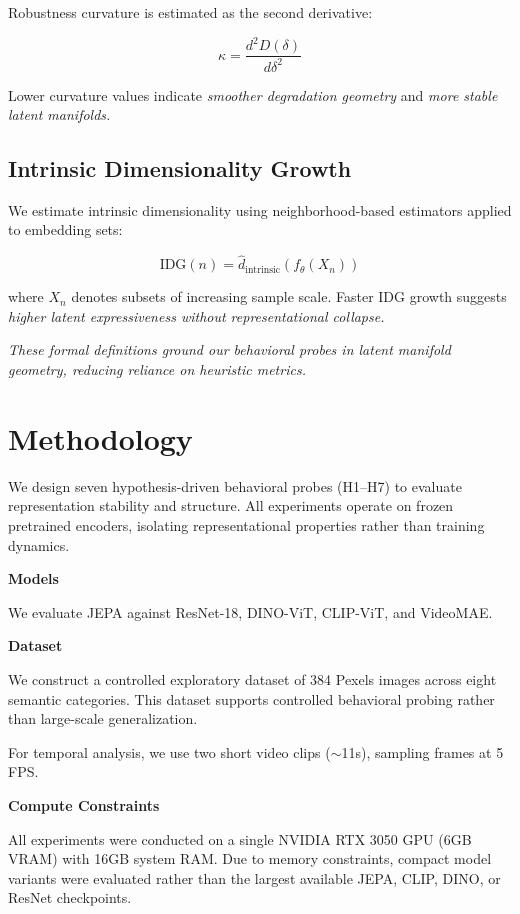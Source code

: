 \documentclass[10pt,twocolumn]{article}
\begin{document}
Robustness curvature is estimated as the second derivative:

\[
\kappa = \frac{d^2 D(\delta)}{d \delta^2}
\]

Lower curvature values indicate \textit{smoother degradation geometry} and \textit{more stable latent manifolds.}


\subsection{Intrinsic Dimensionality Growth}  
We estimate intrinsic dimensionality using neighborhood-based estimators applied to embedding sets:

\[
\text{IDG}(n) = \hat{d}_{\text{intrinsic}}(f_\theta(X_n))
\]

where \( X_n \) denotes subsets of increasing sample scale.  
Faster IDG growth suggests \textit{higher latent expressiveness without representational collapse.}

\textit{These formal definitions ground our behavioral probes in latent manifold geometry, reducing reliance on heuristic metrics.}

\section{Methodology}

We design seven hypothesis-driven behavioral probes (H1–H7) to evaluate representation stability and structure. All experiments operate on frozen pretrained encoders, isolating representational properties rather than training dynamics.

\textbf{Models}

We evaluate JEPA against ResNet-18, DINO-ViT, CLIP-ViT, and VideoMAE.

\textbf{Dataset}

We construct a controlled exploratory dataset of 384 Pexels images across eight semantic categories. This dataset supports controlled behavioral probing rather than large-scale generalization.

For temporal analysis, we use two short video clips ($\sim$11s), sampling frames at 5 FPS.

\textbf{Compute Constraints}

All experiments were conducted on a single NVIDIA RTX 3050 GPU (6GB VRAM) with 16GB system RAM. Due to memory constraints, compact model variants were evaluated rather than the largest available JEPA, CLIP, DINO, or ResNet checkpoints.
\end{document}
